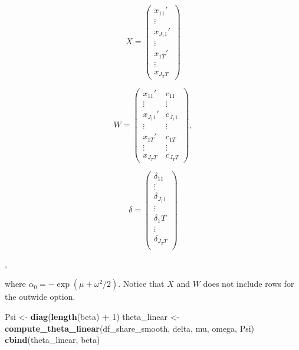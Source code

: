 \documentclass[]{book}
\newenvironment{Shaded}{\begin{snugshade}}{\end{snugshade}}
\newcommand{\KeywordTok}[1]{\textcolor[rgb]{0.13,0.29,0.53}{\textbf{#1}}}
\newcommand{\DecValTok}[1]{\textcolor[rgb]{0.00,0.00,0.81}{#1}}
\newcommand{\StringTok}[1]{\textcolor[rgb]{0.31,0.60,0.02}{#1}}
\newcommand{\OperatorTok}[1]{\textcolor[rgb]{0.81,0.36,0.00}{\textbf{#1}}}
\newcommand{\NormalTok}[1]{#1}
\begin{document}
\begin{equation}
X = 
\begin{pmatrix}
x_{11}'\\
\vdots \\
x_{J_1 1}'\\
\vdots \\
x_{1T}' \\
\vdots \\
x_{J_T T} 
\end{pmatrix}
\end{equation}

\begin{equation}
W = 
\begin{pmatrix}
x_{11}' & c_{11}\\
\vdots & \vdots \\
x_{J_1 1}' & c_{J_1 1}\\
\vdots & \vdots \\
x_{1T}' & c_{1T}\\
\vdots & \vdots \\
x_{J_T T} & c_{J_T T}
\end{pmatrix},
\end{equation}

\begin{equation}
\delta =
\begin{pmatrix}
\delta_11\\
\vdots\\
\delta_{J_1 1}\\
\vdots\\
\delta_1T\\
\vdots\\
\delta_{J_T T}\\
\end{pmatrix}
\end{equation}

,

where \(\alpha_0 = - \exp(\mu + \omega^2/2)\). Notice that \(X\) and
\(W\) does not include rows for the outwide option.

\begin{Shaded}
\begin{Highlighting}[]
\NormalTok{Psi <-}\StringTok{ }\KeywordTok{diag}\NormalTok{(}\KeywordTok{length}\NormalTok{(beta) }\OperatorTok{+}\StringTok{ }\DecValTok{1}\NormalTok{)}
\NormalTok{theta_linear <-}
\StringTok{  }\KeywordTok{compute_theta_linear}\NormalTok{(df_share_smooth, delta, mu, omega, Psi) }
\KeywordTok{cbind}\NormalTok{(theta_linear, beta)}
\end{Highlighting}
\end{Shaded}
\end{document}
